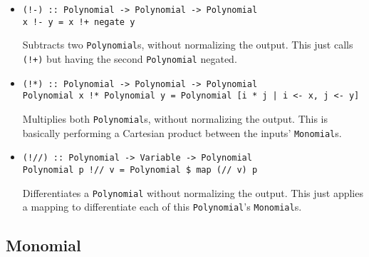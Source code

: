 \documentclass[11pt,a4paper]{article}
\begin{document}
\begin{itemize}
    \item \begin{lstlisting}
(!-) :: Polynomial -> Polynomial -> Polynomial
x !- y = x !+ negate y
    \end{lstlisting}

          Subtracts two \lstinline{Polynomial}s, without normalizing the output. This just calls \lstinline{(!+)} but having the second \lstinline{Polynomial} negated.

    \item \begin{lstlisting}
(!*) :: Polynomial -> Polynomial -> Polynomial
Polynomial x !* Polynomial y = Polynomial [i * j | i <- x, j <- y]
    \end{lstlisting}

          Multiplies both \lstinline{Polynomial}s, without normalizing the output. This is basically performing a Cartesian product between the inputs' \lstinline{Monomial}s.

    \item \begin{lstlisting}
(!//) :: Polynomial -> Variable -> Polynomial
Polynomial p !// v = Polynomial $ map (// v) p
    \end{lstlisting}

          Differentiates a \lstinline{Polynomial} without normalizing the output. This just applies a mapping to differentiate each of this \lstinline{Polynomial}'s \lstinline{Monomial}s.

\end{itemize}

\subsection{Monomial}
\end{document}

